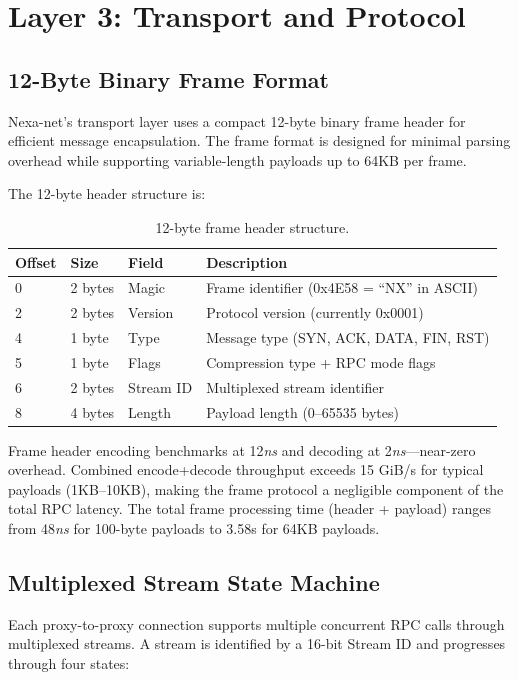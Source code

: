 \section{Layer 3: Transport and Protocol}

\subsection{12-Byte Binary Frame Format}

Nexa-net's transport layer uses a compact 12-byte binary frame header for efficient message encapsulation. The frame format is designed for minimal parsing overhead while supporting variable-length payloads up to 64KB per frame.

The 12-byte header structure is:

\begin{table}[h]
\centering
\begin{tabular}{@{}llll@{}}
\toprule
Offset & Size & Field & Description \\
\midrule
0 & 2 bytes & Magic & Frame identifier (0x4E58 = ``NX'' in ASCII) \\
2 & 2 bytes & Version & Protocol version (currently 0x0001) \\
4 & 1 byte & Type & Message type (SYN, ACK, DATA, FIN, RST) \\
5 & 1 byte & Flags & Compression type + RPC mode flags \\
6 & 2 bytes & Stream ID & Multiplexed stream identifier \\
8 & 4 bytes & Length & Payload length (0--65535 bytes) \\
\bottomrule
\end{tabular}
\caption{12-byte frame header structure.}
\label{tab:frame-format}
\end{table}

Frame header encoding benchmarks at 12\textit{ns} and decoding at 2\textit{ns}---near-zero overhead. Combined encode+decode throughput exceeds 15 GiB/s for typical payloads (1KB--10KB), making the frame protocol a negligible component of the total RPC latency. The total frame processing time (header + payload) ranges from 48\textit{ns} for 100-byte payloads to 3.58\textmu s for 64KB payloads.

\subsection{Multiplexed Stream State Machine}

Each proxy-to-proxy connection supports multiple concurrent RPC calls through multiplexed streams. A stream is identified by a 16-bit Stream ID and progresses through four states:


